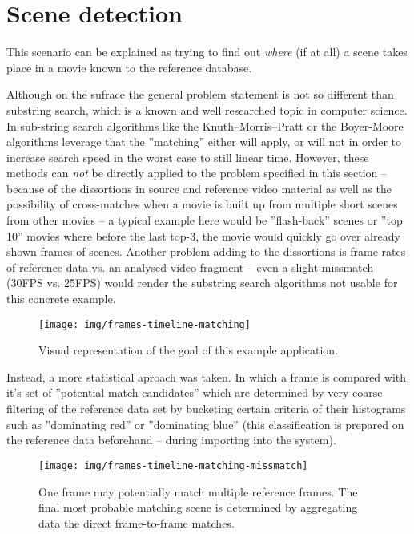 \section{Scene detection}
\label{sec:scene-detection}
This scenario can be explained as trying to find out \textit{where} (if at all) a scene takes place in a movie known to the reference database. 

Although on the sufrace the general problem statement is not so different than substring search, which is a known and well researched topic in computer science. In sub-string search algorithms like the Knuth–Morris–Pratt \cite{kmp-string-search} or the Boyer-Moore \cite{boyer-string-search} algorithms leverage that the ''matching'' either will apply, or will not in order to increase search speed in the worst case to still linear time. However, these methods can \textit{not} be directly applied to the problem specified in this section -- because of the dissortions in source and reference video material as well as the possibility of cross-matches when a movie is built up from multiple short scenes from other movies -- a typical example here would be ''flash-back'' scenes or ''top 10'' movies where before the last top-3, the movie would quickly go over already shown frames of scenes. Another problem adding to the dissortions is frame rates of reference data vs. an analysed video fragment -- even a slight missmatch (30FPS vs. 25FPS) would render the substring search algorithms not usable for this concrete example.

\begin{figure}[ch!]
  \centering
  \texttt{[image: img/frames-timeline-matching]}
  \caption{Visual representation of the goal of this example application.}
\end{figure}

Instead, a more statistical aproach was taken. In which a frame is compared with it's set of ''potential match candidates'' which are determined by very coarse filtering of the reference data set by bucketing certain criteria of their histograms such as ''dominating red'' or ''dominating blue'' (this classification is prepared on the reference data beforehand -- during importing into the system).



\begin{figure}[ch!]
  \centering
  \texttt{[image: img/frames-timeline-matching-missmatch]}
  \caption{One frame may potentially match multiple reference frames. The final most probable matching scene is determined by aggregating data the direct frame-to-frame matches.}
\end{figure}


